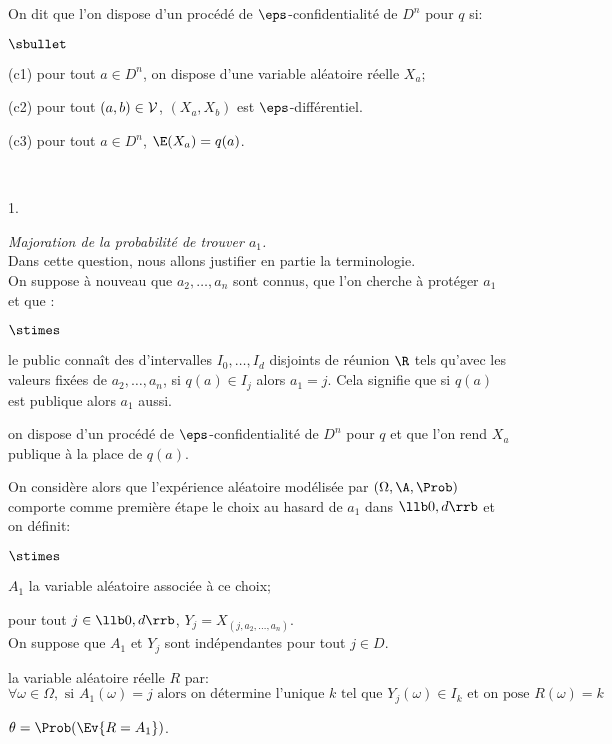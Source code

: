 \documentclass[11pt]{article}%
\begin{document}
On dit que l'on dispose d'un procédé de $\eps$-confidentialité de
$D^n$ pour $q$ si:
\begin{liste}{$\sbullet$}
\item[(c1)] pour tout $a\in D^n$, on dispose d'une variable aléatoire
  réelle $X_a$;
\item[(c2)] pour tout $(a,b) \in {\cal V}$, $(X_a,X_b)$ est
  $\eps$-différentiel.
\item[(c3)] pour tout $a\in D^n$, $\E(X_a) = q(a)$.
\end{liste}~\\[-.4cm]
\begin{noliste}{1.}
  \setcounter{enumi}{12} %
  \setlength{\itemsep}{4mm}
\item {\em Majoration de la probabilité de trouver $a_1$.}\\
  Dans cette question, nous allons justifier en partie la
  terminologie.\\
  On suppose à nouveau que $a_2, \ldots ,a_n$ sont connus, que l'on
  cherche à protéger $a_1$ et que :
  \begin{noliste}{$\stimes$}
  \item le public connaît des d'intervalles $I_0,\ldots,I_d$ disjoints
    de réunion $\R$ tels qu'avec les valeurs fixées de $a_2, \ldots,
    a_n$, si $q(a) \in I_j$ alors $a_1 = j$. Cela signifie que si
    $q(a)$ est publique alors $a_1$ aussi.
  \item on dispose d'un procédé de $\eps$-confidentialité de $D^n$
    pour $q$ et que l'on rend $X_a$ publique à la place de $q(a)$.
  \end{noliste}
  On considère alors que l'expérience aléatoire modélisée par
  $(\Omega, \A, \Prob)$ comporte comme première étape le choix au
  hasard de $a_1$ dans $\llb 0, d \rrb$ et on définit:
  \begin{noliste}{$\stimes$}
  \item $A_1$ la variable aléatoire associée à ce choix;
  \item pour tout $j \in \llb 0, d \rrb$, $Y_j = X_{(j, a_2, \ldots,
      a_n)}$. \\
    On suppose que $A_1$ et $Y_j$ sont indépendantes pour tout $j\in
    D$.
  \item la variable aléatoire réelle $R$ par:
    \[
    \forall \omega\in\Omega, \text{ si } A_1(\omega) = j \text{ alors
      on détermine l'unique } k \text{ tel que } Y_j(\omega)\in I_k
    \text{ et on pose } R(\omega)=k
    \]
  \item $\theta = \Prob(\Ev{R = A_1})$.
  \end{noliste}



\end{noliste}
\end{document}
